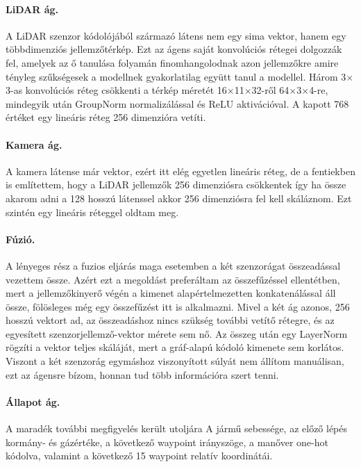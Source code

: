 \documentclass[a4paper,12pt,oneside]{article}
\begin{document}
\paragraph{LiDAR ág.} A LiDAR szenzor kódolójából származó látens nem egy sima vektor, 
hanem egy többdimenziós jellemzőtérkép. Ezt az ágens saját konvolúciós rétegei dolgozzák
fel, amelyek az ő tanulása folyamán finomhangolodnak azon jellemzőkre amire tényleg szűkségesek a modellnek
gyakorlatilag együtt tanul a modellel. 
Három 3$\times$3-as konvolúciós réteg csökkenti a térkép méretét 
16$\times$11$\times$32-ről 64$\times$3$\times$4-re, mindegyik után GroupNorm normalizálással 
és ReLU aktivációval. 
A kapott 768 értéket egy lineáris réteg 256 dimenzióra vetíti.

\paragraph{Kamera ág.} A kamera látense már vektor, ezért itt elég egyetlen
lineáris réteg, de a fentiekben is említettem, hogy a LiDAR jellemzők 256 dimenziósra csökkentek
így ha össze akarom adni a 128 hosszú látenssel akkor 256 dimenziósra fel kell skáláznom. Ezt szintén 
egy lineáris réteggel oldtam meg.

\paragraph{Fúzió.} A lényeges rész a fuzios eljárás maga esetemben a két szenzorágat 
összeadással vezettem össze. Azért ezt a megoldást preferáltam 
az összefűzéssel ellentétben, mert a jellemzőkinyerő végén a kimenet
alapértelmezetten konkatenálással áll össze, fölösleges még egy összefűzést itt is alkalmazni. 
Mivel a két ág azonos, 256 hosszú vektort ad, az összeadáshoz nincs szükség további
vetítő rétegre, és az egyesített szenzorjellemző-vektor mérete sem nő. Az összeg után egy
LayerNorm rögzíti a vektor teljes skáláját, mert a gráf-alapú kódoló kimenete
sem korlátos. Viszont a két szenzorág egymáshoz viszonyított súlyát nem állítom manuálisan,
ezt az ágensre bízom, honnan tud több információra szert tenni.

\paragraph{Állapot ág.} A maradék további megfigyelés került utoljára A jármű sebessége,
az előző lépés kormány- és gázértéke, a következő waypoint irányszöge, a
manőver one-hot kódolva, valamint a következő 15 waypoint relatív koordinátái.
\end{document}
